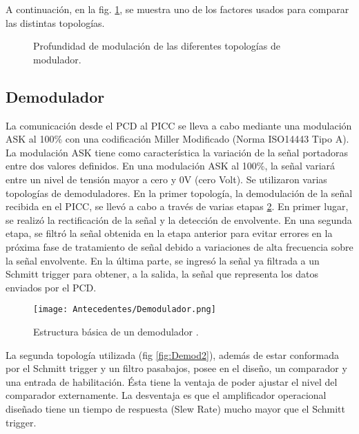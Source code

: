 A continuación, en la fig. \ref{fig:prof_moduladores}, se muestra uno de los factores usados para comparar las distintas topologías.

\begin{figure}[H]
 \centering
    \newline
 \caption{Profundidad de modulación de las diferentes topologías de modulador.}
 \label{fig:prof_moduladores}
\end{figure}


\subsection{Demodulador} \label{subsec:demodulador}
La comunicación desde el PCD al PICC se lleva a cabo mediante una
modulación ASK al 100\% con una codificación Miller Modificado
(Norma ISO14443 Tipo A). La modulación ASK
tiene como característica la variación de la señal
portadoras entre dos valores definidos. En
una modulación ASK al 100\%, la señal variará
entre un nivel de tensión mayor a cero y 0V
(cero Volt).
Se utilizaron varias topologías de demoduladores.
En la primer topología, la demodulación de la señal recibida en el
PICC, se llevó a cabo a través de varias etapas \ref{fig:Demo}. En primer lugar, se realizó la rectificación
de la señal y la detección de envolvente.
En una segunda etapa, se filtró la señal obtenida
en la etapa anterior para evitar errores en
la próxima fase de tratamiento de señal debido
a variaciones de alta frecuencia sobre la señal
envolvente. En la última parte, se ingresó la
señal ya filtrada a un Schmitt trigger \cite{schmitt} para obtener, a la salida, la señal
que representa los datos enviados por el PCD.
\begin{figure}[H]
\centering
\texttt{[image: Antecedentes/Demodulador.png]}
\caption{Estructura básica de un demodulador \cite{RFID_Tuto}.}
\label{fig:Demo}
\end{figure}
La segunda topología utilizada (fig \ref{fig:Demod2}), además de estar conformada
por el Schmitt trigger y un filtro pasabajos,
posee en el diseño, un comparador y una entrada
de habilitación. Ésta tiene la ventaja de
poder ajustar el nivel del comparador externamente.
La desventaja es que el amplificador
operacional diseñado tiene un tiempo de
respuesta (Slew Rate) mucho mayor que el
Schmitt trigger.

